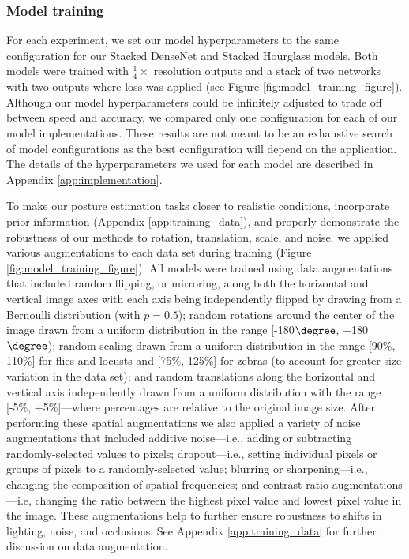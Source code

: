 \documentclass[11pt,a4paper,oneside]{article}
\begin{document}
\subsubsection{Model training}
For each experiment, we set our model hyperparameters to the same configuration for our Stacked DenseNet and Stacked Hourglass models. Both models were trained with $\tfrac{1}{4}\times$ resolution outputs and a stack of two networks with two outputs where loss was applied (see Figure \ref{fig:model_training_figure}). Although our model hyperparameters could be infinitely adjusted to trade off between speed and accuracy, we compared only one configuration for each of our model implementations. These results are not meant to be an exhaustive search of model configurations as the best configuration will depend on the application. The details of the hyperparameters we used for each model are described in Appendix \ref{app:implementation}.

To make our posture estimation tasks closer to realistic conditions, incorporate prior information (Appendix \ref{app:training_data}), and properly demonstrate the robustness of our methods to rotation, translation, scale, and noise, we applied various augmentations to each data set during training (Figure \ref{fig:model_training_figure}). All models were trained using data augmentations that included random flipping, or mirroring, along both the horizontal and vertical image axes with each axis being independently flipped by drawing from a Bernoulli distribution (with $p=0.5$); random rotations around the center of the image drawn from a uniform distribution in the range [-180$\degree$, +180$\degree$); random scaling drawn from a uniform distribution in the range [90\%, 110\%] for flies and locusts and [75\%, 125\%] for zebras (to account for greater size variation in the data set); and random translations along the horizontal and vertical axis independently drawn from a uniform distribution with the range [-5\%, +5\%]---where percentages are relative to the original image size. After performing these spatial augmentations we also applied a variety of noise augmentations that included additive noise---i.e., adding or subtracting randomly-selected values to pixels; dropout---i.e., setting individual pixels or groups of pixels to a randomly-selected value; blurring or sharpening---i.e., changing the composition of spatial frequencies; and contrast ratio augmentations---i.e, changing the ratio between the highest pixel value and lowest pixel value in the image. These augmentations help to further ensure robustness to shifts in lighting, noise, and occlusions. See Appendix \ref{app:training_data} for further discussion on data augmentation.
\end{document}
